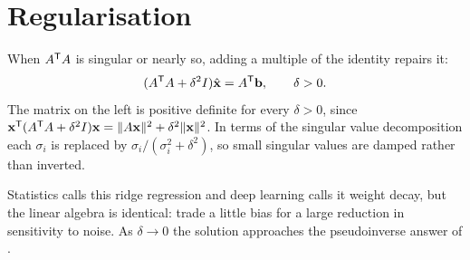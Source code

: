 \section{Regularisation}

When \(A^{\mathsf{T}} A\) is singular or nearly so, adding a multiple of the identity
repairs it:
\[
	(A^{\mathsf{T}} A+\delta^{2}I)\hat{\mathbf{x}}=A^{\mathsf{T}}\mathbf{b},
	\qquad \delta>0 .
\]
The matrix on the left is positive definite for every \(\delta>0\), since
\(\mathbf{x}^{\mathsf{T}}(A^{\mathsf{T}} A+\delta^{2}I)\mathbf{x}
=\lVert A\mathbf{x}\rVert^{2}+\delta^{2}\lVert\mathbf{x}\rVert^{2}\). In terms of the
singular value decomposition each \(\sigma_i\) is replaced by
\(\sigma_i/(\sigma_i^{2}+\delta^{2})\), so small singular values are damped
rather than inverted.

\begin{remark}
Statistics calls this ridge regression and deep learning calls it weight decay,
but the linear algebra is identical: trade a little bias for a large reduction
in sensitivity to noise. As \(\delta\to0\) the solution approaches the
pseudoinverse answer of .
\end{remark}
